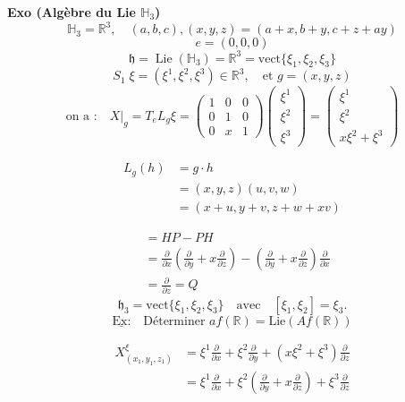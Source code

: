 \documentclass[11pt,a4paper]{article}
\begin{document}
\textbf{Exo (Algèbre du Lie $\mathbb{H}_3$)}
\[
\mathbb{H}_3 = \mathbb{R}^3, \quad (a,b,c), (x,y,z) = (a+x, b+y, c+z+ay)
\]
\[
e = (0,0,0)
\]
\[
\mathfrak{h} = \operatorname{Lie}(\mathbb{H}_3) = \mathbb{R}^3 = \mathrm{vect}\{\xi_1, \xi_2, \xi_3\}
\]
\[
S_1 \; \xi = (\xi^1, \xi^2, \xi^3) \in \mathbb{R}^3, \quad \text{et } g=(x,y,z)
\]
\[
\text{on a :} \quad X|_g = T_e L_g \xi = 
\begin{pmatrix}
	1 & 0 & 0 \\
	0 & 1 & 0 \\
	0 & x & 1
\end{pmatrix}
\begin{pmatrix}
	\xi^1 \\ \xi^2 \\ \xi^3
\end{pmatrix}
=
\begin{pmatrix}
	\xi^1 \\ \xi^2 \\ x\xi^2 + \xi^3
\end{pmatrix}
\]

\begin{align*}
	L_g(h) &= g \cdot h\\
	&= (x, y, z)(u, v, w)\\
	&= (x + u, y + v, z + w + x v)
\end{align*}


\begin{align*}
	[H, P] &= HP - PH\\
	&= \frac{\partial}{\partial x}\left(\frac{\partial}{\partial y} + x \frac{\partial}{\partial z}\right)
	- \left(\frac{\partial}{\partial y} + x \frac{\partial}{\partial z}\right)\frac{\partial}{\partial x}\\
	&= \frac{\partial}{\partial z} = Q
\end{align*}
\[
\mathfrak{h}_3 = \mathrm{vect}\{\xi_1, \xi_2, \xi_3\} \quad \text{avec} \quad [\xi_1, \xi_2] = \xi_3.
\]
\[
\underline{\text{Ex:}} \quad \text{Déterminer } af(\mathbb{R}) = \mathrm{Lie}(Af(\mathbb{R}))
\]

\begin{align*}
	X^{\xi}_{(x_1, y_1, z_1)} &= \xi^1 \frac{\partial}{\partial x} + \xi^2 \frac{\partial}{\partial y}
	+ (x \xi^2 + \xi^3) \frac{\partial}{\partial z} \\
	&= \xi^1 \frac{\partial}{\partial x} + \xi^2\left(\frac{\partial}{\partial y} + x \frac{\partial}{\partial z}\right)
	+ \xi^3 \frac{\partial}{\partial z}
\end{align*}
\end{document}
